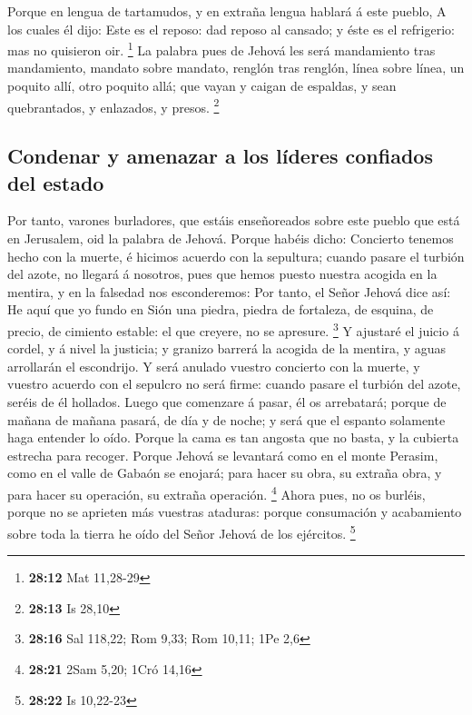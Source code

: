  Porque en lengua de tartamudos, y en extraña lengua
hablará á este pueblo,  A los cuales él dijo: Este es el
reposo: dad reposo al cansado; y éste es el refrigerio: mas no quisieron
oir. \footnote{\textbf{28:12} Mat 11,28-29}  La palabra
pues de Jehová les será mandamiento tras mandamiento, mandato sobre
mandato, renglón tras renglón, línea sobre línea, un poquito allí, otro
poquito allá; que vayan y caigan de espaldas, y sean quebrantados, y
enlazados, y presos. \footnote{\textbf{28:13} Is 28,10}

\hypertarget{condenar-y-amenazar-a-los-luxedderes-confiados-del-estado}{%
\subsection{Condenar y amenazar a los líderes confiados del
estado}\label{condenar-y-amenazar-a-los-luxedderes-confiados-del-estado}}

 Por tanto, varones burladores, que estáis enseñoreados
sobre este pueblo que está en Jerusalem, oid la palabra de Jehová.
 Porque habéis dicho: Concierto tenemos hecho con la
muerte, é hicimos acuerdo con la sepultura; cuando pasare el turbión del
azote, no llegará á nosotros, pues que hemos puesto nuestra acogida en
la mentira, y en la falsedad nos esconderemos:  Por tanto,
el Señor Jehová dice así: He aquí que yo fundo en Sión una piedra,
piedra de fortaleza, de esquina, de precio, de cimiento estable: el que
creyere, no se apresure. \footnote{\textbf{28:16} Sal 118,22; Rom 9,33;
  Rom 10,11; 1Pe 2,6}  Y ajustaré el juicio á cordel, y á
nivel la justicia; y granizo barrerá la acogida de la mentira, y aguas
arrollarán el escondrijo.  Y será anulado vuestro concierto
con la muerte, y vuestro acuerdo con el sepulcro no será firme: cuando
pasare el turbión del azote, seréis de él hollados.  Luego
que comenzare á pasar, él os arrebatará; porque de mañana de mañana
pasará, de día y de noche; y será que el espanto solamente haga entender
lo oído.  Porque la cama es tan angosta que no basta, y la
cubierta estrecha para recoger.  Porque Jehová se levantará
como en el monte Perasim, como en el valle de Gabaón se enojará; para
hacer su obra, su extraña obra, y para hacer su operación, su extraña
operación. \footnote{\textbf{28:21} 2Sam 5,20; 1Cró 14,16} 
Ahora pues, no os burléis, porque no se aprieten más vuestras ataduras:
porque consumación y acabamiento sobre toda la tierra he oído del Señor
Jehová de los ejércitos. \footnote{\textbf{28:22} Is 10,22-23}


